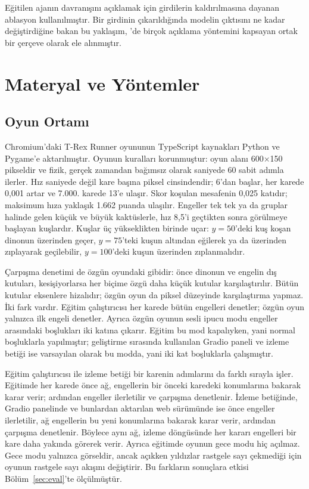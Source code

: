 \documentclass[11pt,a4paper]{article}
\begin{document}
Eğitilen ajanın davranışını açıklamak için girdilerin kaldırılmasına dayanan ablasyon kullanılmıştır. Bir girdinin çıkarıldığında modelin çıktısını ne kadar değiştirdiğine bakan bu yaklaşım, \cite{covert2021}'de birçok açıklama yöntemini kapsayan ortak bir çerçeve olarak ele alınmıştır.

\section{Materyal ve Yöntemler}

\subsection{Oyun Ortamı}

Chromium'daki T-Rex Runner oyununun TypeScript kaynakları \cite{chromium} Python ve Pygame'e \cite{pygame} aktarılmıştır. Oyunun kuralları korunmuştur: oyun alanı 600$\times$150 pikseldir ve fizik, gerçek zamandan bağımsız olarak saniyede 60 sabit adımla ilerler. Hız saniyede değil kare başına piksel cinsindendir; 6'dan başlar, her karede 0,001 artar ve 7.000. karede 13'e ulaşır. Skor koşulan mesafenin 0,025 katıdır; maksimum hıza yaklaşık 1.662 puanda ulaşılır. Engeller tek tek ya da gruplar halinde gelen küçük ve büyük kaktüslerle, hız 8,5'i geçtikten sonra görülmeye başlayan kuşlardır. Kuşlar üç yükseklikten birinde uçar: $y=50$'deki kuş koşan dinonun üzerinden geçer, $y=75$'teki kuşun altından eğilerek ya da üzerinden zıplayarak geçilebilir, $y=100$'deki kuşun üzerinden zıplanmalıdır.

Çarpışma denetimi de özgün oyundaki gibidir: önce dinonun ve engelin dış kutuları, kesişiyorlarsa her biçime özgü daha küçük kutular karşılaştırılır. Bütün kutular eksenlere hizalıdır; özgün oyun da piksel düzeyinde karşılaştırma yapmaz. İki fark vardır. Eğitim çalıştırıcısı her karede bütün engelleri denetler; özgün oyun yalnızca ilk engeli denetler. Ayrıca özgün oyunun sesli ipucu modu engeller arasındaki boşlukları iki katına çıkarır. Eğitim bu mod kapalıyken, yani normal boşluklarla yapılmıştır; geliştirme sırasında kullanılan Gradio paneli ve izleme betiği ise varsayılan olarak bu modda, yani iki kat boşluklarla çalışmıştır.

Eğitim çalıştırıcısı ile izleme betiği bir karenin adımlarını da farklı sırayla işler. Eğitimde her karede önce ağ, engellerin bir önceki karedeki konumlarına bakarak karar verir; ardından engeller ilerletilir ve çarpışma denetlenir. İzleme betiğinde, Gradio panelinde ve bunlardan aktarılan web sürümünde ise önce engeller ilerletilir, ağ engellerin bu yeni konumlarına bakarak karar verir, ardından çarpışma denetlenir. Böylece aynı ağ, izleme döngüsünde her kararı engelleri bir kare daha yakında görerek verir. Ayrıca eğitimde oyunun gece modu hiç açılmaz. Gece modu yalnızca görseldir, ancak açıkken yıldızlar rastgele sayı çekmediği için oyunun rastgele sayı akışını değiştirir. Bu farkların sonuçlara etkisi Bölüm~\ref{sec:eval}'te ölçülmüştür.
\end{document}
